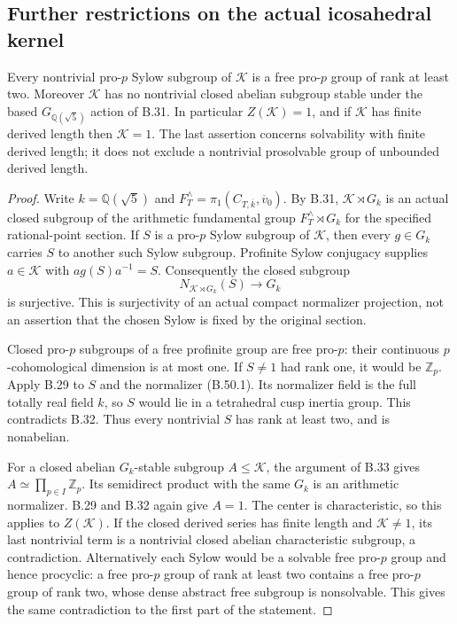 \subsection{Further restrictions on the actual icosahedral kernel}

Every nontrivial pro-$p$ Sylow subgroup of $\mathcal K$
is a free pro-$p$ group of rank at least two.  Moreover
$\mathcal K$ has no nontrivial closed abelian subgroup
stable under the based $G_{\mathbb Q(\sqrt5)}$ action
of B.31.  In particular $Z(\mathcal K)=1$, and if
$\mathcal K$ has finite derived length then $\mathcal K=1$.
The last assertion concerns solvability with finite
derived length; it does not exclude a nontrivial
prosolvable group of unbounded derived length.

\begin{proof}
Write $k=\mathbb Q(\sqrt5)$ and
$F_T^{\wedge}=\pi_1(C_{T,\overline k},\overline v_0)$.
By B.31, $\mathcal K\rtimes G_k$ is an actual
closed subgroup of the arithmetic fundamental
group $F_T^{\wedge}\rtimes G_k$ for the specified
rational-point section.  If $S$ is a pro-$p$
Sylow subgroup of $\mathcal K$, then every
$g\in G_k$ carries $S$ to another such Sylow
subgroup.  Profinite Sylow conjugacy supplies
$a\in\mathcal K$ with $ag(S)a^{-1}=S$.
Consequently the closed subgroup
\[
       N_{\mathcal K\rtimes G_k}(S)
                        \longrightarrow G_k               \tag{B.50.1}
\]
is surjective.  This is surjectivity of an
actual compact normalizer projection, not
an assertion that the chosen Sylow is
fixed by the original section.

Closed pro-$p$ subgroups of a free profinite
group are free pro-$p$: their continuous
$p$-cohomological dimension is at most one.
If $S\ne1$ had rank one, it would be
$\mathbb Z_p$.  Apply B.29 to $S$ and
the normalizer (B.50.1).  Its normalizer
field is the full totally real field $k$,
so $S$ would lie in a tetrahedral cusp
inertia group.  This contradicts B.32.
Thus every nontrivial $S$ has rank at
least two, and is nonabelian.

For a closed abelian $G_k$-stable subgroup
$A\leq\mathcal K$, the argument of B.33
gives $A\simeq\prod_{p\in I}\mathbb Z_p$.
Its semidirect product with the same
$G_k$ is an arithmetic normalizer.
B.29 and B.32 again give $A=1$.
The center is characteristic, so this
applies to $Z(\mathcal K)$.
If the closed derived series has
finite length and $\mathcal K\ne1$,
its last nontrivial term is a
nontrivial closed abelian characteristic
subgroup, a contradiction.  Alternatively
each Sylow would be a solvable free
pro-$p$ group and hence procyclic:
a free pro-$p$ group of rank at least
two contains a free pro-$p$ group of
rank two, whose dense abstract free
subgroup is nonsolvable.  This gives
the same contradiction to the first
part of the statement.
\end{proof}

